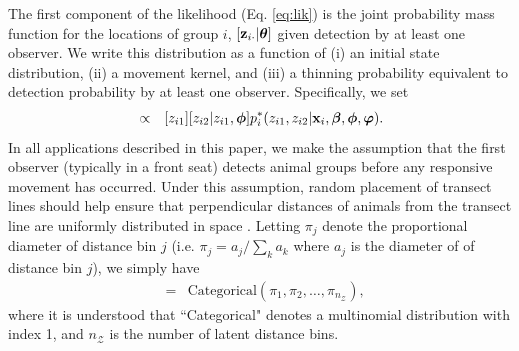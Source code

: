 \documentclass[12pt,fleqn]{article}
\begin{document}
The first component of the likelihood (Eq. \ref{eq:lik}) is the joint probability mass function for the locations of group $i$, $[{\bf z}_{i \cdot} |\boldsymbol{\theta}]$ given detection by at least one observer.  We write this distribution as a function of (i) an initial state distribution, (ii) a movement kernel, and (iii) a thinning probability equivalent to detection probability by at least one observer.  Specifically, we set
\begin{eqnarray}
[{\bf z}_{i \cdot} |\boldsymbol{\theta}] & \propto & [z_{i1}][z_{i2}|z_{i1},\boldsymbol{\phi}]p_i^*(z_{i1},z_{i2}|{\bf x}_i,\boldsymbol{\beta},\boldsymbol{\phi},\boldsymbol{\varphi}).
\end{eqnarray}
In all applications described in this paper, we make the assumption that the first observer (typically in a front seat) detects animal groups before any responsive movement has occurred.  Under this assumption, random placement of transect lines should help ensure that perpendicular distances of animals from the transect line are uniformly distributed in space \citep[cf.][]{BucklandEtAl2001}.  Letting $\pi_j$ denote the proportional diameter of distance bin $j$ (i.e. $\pi_j = a_j / \sum_k a_k$ where $a_j$ is the diameter of of distance bin $j$), we simply have
\begin{eqnarray*}
  [z_{i1}] & = & \text{Categorical}(\pi_1,\pi_2,\hdots,\pi_{n_{\mathcal{Z}}}),
\end{eqnarray*}
where it is understood that ``Categorical" denotes a multinomial distribution with index 1, and $n_{\mathcal{Z}}$ is the number of latent distance bins.
\end{document}
